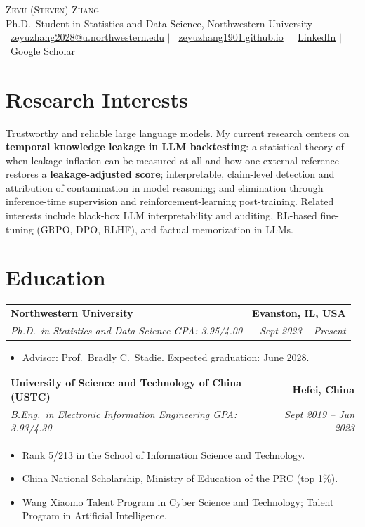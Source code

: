 \documentclass[10.5pt]{article}
\makeatletter
\newcommand{\entry}[4]{%
  \begin{tabularx}{\textwidth}{@{}X@{}r@{}}
    \textbf{#1} & \textbf{#2} \\
    {\itshape\color{metagray}#3} & {\itshape\color{metagray}#4} \\
  \end{tabularx}\vspace{1pt}}
\newenvironment{bullets}
  {\begin{itemize}[leftmargin=1.35em, topsep=2pt, itemsep=1.5pt, parsep=0pt,
                   label=\textcolor{accent}{\footnotesize$\bullet$}]\small}
  {\end{itemize}}
\makeatother
\begin{document}
\begin{center}
  {\Huge\scshape Zeyu (Steven) Zhang}\\[5pt]
  {\color{metagray}Ph.D.\ Student in Statistics and Data Science, Northwestern University}\\[5pt]
  {\small
    \faEnvelope\ \href{mailto:zeyuzhang2028@u.northwestern.edu}{zeyuzhang2028@u.northwestern.edu}
    \;$|$\;
    \faGlobe\ \href{https://zeyuzhang1901.github.io}{zeyuzhang1901.github.io}
    \;$|$\;
    \faLinkedin\ \href{https://www.linkedin.com/in/zeyu-zhang-42813a271/}{LinkedIn}
    \;$|$\;
    \faGraduationCap\ \href{https://scholar.google.com/citations?user=dr-xetEAAAAJ}{Google Scholar}
  }
\end{center}

\section{Research Interests}
Trustworthy and reliable large language models. My current research centers on
\textbf{temporal knowledge leakage in LLM backtesting}: a statistical theory of when
leakage inflation can be measured at all and how one external reference restores a
\textbf{leakage-adjusted score}; interpretable, claim-level detection and attribution
of contamination in model reasoning; and elimination through inference-time
supervision and reinforcement-learning post-training. Related interests include
black-box LLM interpretability and auditing, RL-based fine-tuning (GRPO, DPO, RLHF),
and factual memorization in LLMs.

\section{Education}

\entry{Northwestern University}{Evanston, IL, USA}
  {Ph.D.\ in Statistics and Data Science \quad GPA: 3.95/4.00}{Sept 2023 -- Present}
\begin{bullets}
  \item Advisor: Prof.\ Bradly C.\ Stadie. Expected graduation: June 2028.
\end{bullets}

\vspace{4pt}
\entry{University of Science and Technology of China (USTC)}{Hefei, China}
  {B.Eng.\ in Electronic Information Engineering \quad GPA: 3.93/4.30}{Sept 2019 -- Jun 2023}
\begin{bullets}
  \item Rank 5/213 in the School of Information Science and Technology.
  \item China National Scholarship, Ministry of Education of the PRC (top 1\%).
  \item Wang Xiaomo Talent Program in Cyber Science and Technology; Talent Program in Artificial Intelligence.
\end{bullets}
\end{document}
